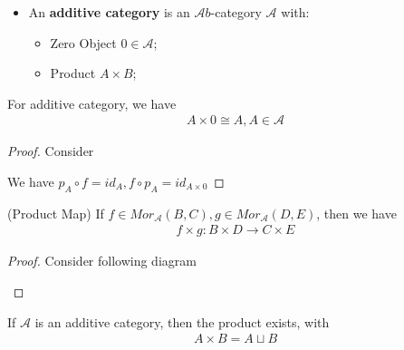 \documentclass[Total.tex]{subfiles}
\begin{document}
			\begin{Def}
				\begin{itemize}
					\item An \textbf{additive category} is an $\mathcal Ab$-category $\mathcal{A}$ with:
					\begin{itemize}
						\item Zero Object $0\in \mathcal{A}$;
						\item Product $A\times B$;
					\end{itemize}
				\end{itemize}
			\end{Def}
			\begin{lemma}
				For additive category, we have
				\begin{gather*}
					A\times 0\cong A, A\in \mathcal{A}
				\end{gather*}
			\end{lemma}
			\begin{proof}
				Consider 
				\begin{center}
				\end{center}
				We have $p_A\circ f=id_A,f\circ p_A=id_{A\times 0}$
			\end{proof}
			\begin{lemma}
				(Product Map) If $f\in Mor_\mathcal{A}(B,C),g\in Mor_\mathcal{A}(D,E)$, then we have
				\begin{gather*}
					f\times g:B\times D\rightarrow C\times E
				\end{gather*} 
			\end{lemma}
			\begin{proof}
				Consider following diagram
				\begin{center}
				\end{center}
			\end{proof}
			\begin{proposition}
				If $\mathcal{A}$ is an additive category, then the product exists, with
				\begin{gather*}
					A\times B=A\sqcup B
				\end{gather*}
			\end{proposition}
\end{document}
